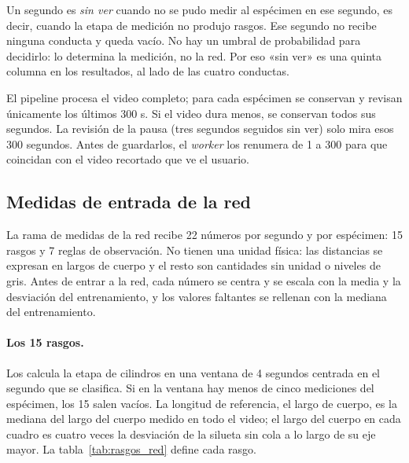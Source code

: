 Un segundo es \textit{sin ver} cuando no se pudo medir al espécimen en ese segundo, es decir, cuando la etapa de
medición no produjo rasgos. Ese segundo no recibe ninguna conducta y queda vacío. No hay un umbral de probabilidad
para decidirlo: lo determina la medición, no la red. Por eso «sin ver» es una quinta columna en los resultados, al lado
de las cuatro conductas.

El pipeline procesa el video completo; para cada espécimen se conservan y revisan únicamente los últimos 300 s. Si el
video dura menos, se conservan todos sus segundos. La revisión de la pausa (tres segundos seguidos sin ver) solo mira
esos 300 segundos. Antes de guardarlos, el \textit{worker} los renumera de 1 a 300 para que coincidan con el video
recortado que ve el usuario.

\subsection{Medidas de entrada de la red}
\label{sec:medidas_red}

La rama de medidas de la red recibe 22 números por segundo y por espécimen: 15 rasgos y 7 reglas de observación. No
tienen una unidad física: las distancias se expresan en largos de cuerpo y el resto son cantidades sin unidad o
niveles de gris. Antes de entrar a la red, cada número se centra y se escala con la media y la desviación del
entrenamiento, y los valores faltantes se rellenan con la mediana del entrenamiento.

\paragraph{Los 15 rasgos.} Los calcula la etapa de cilindros en una ventana de 4 segundos centrada en el segundo que
se clasifica. Si en la ventana hay menos de cinco mediciones del espécimen, los 15 salen vacíos. La longitud de
referencia, el largo de cuerpo, es la mediana del largo del cuerpo medido en todo el video; el largo del cuerpo en
cada cuadro es cuatro veces la desviación de la silueta sin cola a lo largo de su eje mayor. La
tabla~\ref{tab:rasgos_red} define cada rasgo.

